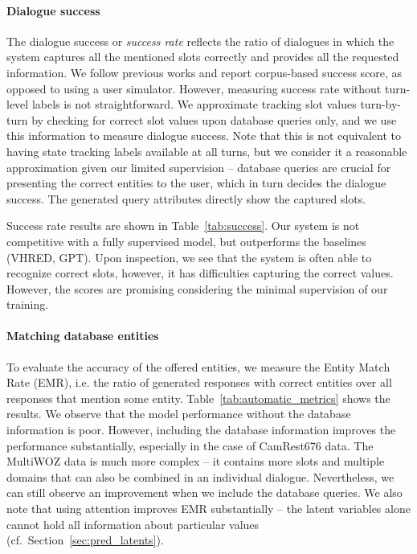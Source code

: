\paragraph{Dialogue success}
The dialogue success or \emph{success rate} reflects the ratio of dialogues in which the system captures all the mentioned slots correctly and provides all the requested information.
We follow previous works \cite{nekvinda2021shades} and report corpus-based success score, as opposed to using a user simulator.
However, measuring success rate without turn-level labels is not straightforward. %
%
We approximate tracking slot values turn-by-turn by checking for correct slot values upon database queries only, and we use this information to measure dialogue success.
Note that this is not equivalent to having state tracking labels available at all turns, but we consider it a reasonable approximation given our limited supervision -- database queries are crucial for presenting the correct entities to the user, which in turn decides the dialogue success.
The generated query attributes directly show the captured slots.

Success rate results are shown in Table~\ref{tab:success}.
Our system is not competitive with a fully supervised model, but outperforms the baselines (VHRED, GPT).
Upon inspection,
we see that the system is often able to recognize correct slots, however, it has difficulties capturing the correct values.
However, the scores  are promising considering the minimal supervision of our training.

\paragraph{Matching database entities}
\label{sec:emr}
To evaluate the accuracy of the offered entities, we measure the Entity Match Rate (EMR), i.e. the ratio of generated responses with correct entities over all responses that mention some entity.
Table~\ref{tab:automatic_metrics} shows  the results.
We observe that the model performance without the database information is poor.
However, including the database information improves the performance substantially, especially in the case of CamRest676 data.
The MultiWOZ data is much more complex -- it contains more slots and multiple domains that can also be combined in an individual dialogue.
Nevertheless, we can still observe an improvement when we include the database queries.
We also note that using attention improves EMR substantially -- the latent variables alone cannot hold all information about particular values (cf.~Section~\ref{sec:pred_latents}).


